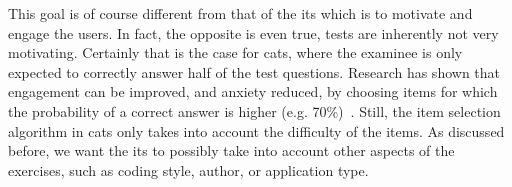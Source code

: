 This goal is of course different from that of the \gls{its} which is to motivate and engage the users. 
In fact, the opposite is even true, tests are inherently not very motivating.
Certainly that is the case for \glspl{cat}, where the examinee is only expected to correctly answer half of the test questions.
Research has shown that engagement can be improved, and anxiety reduced, by choosing items for which the probability of a correct answer is higher (e.g. 70\%)~\cite{ling2017computerized}. 
Still, the item selection algorithm in \glspl{cat} only takes into account the difficulty of the items. 
As discussed before, we want the \gls{its} to possibly take into account other aspects of the exercises, such as coding style, author, or application type.